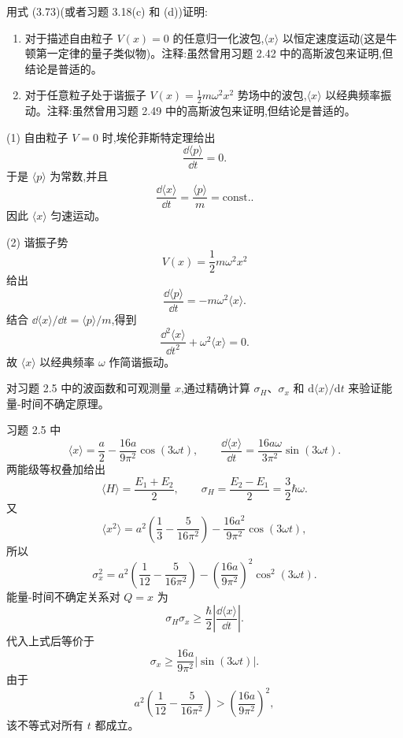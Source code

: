 \begin{question}
用式 (3.73)(或者习题 3.18(c) 和 (d))证明:
\begin{enumerate}
\item 对于描述自由粒子 $V(x)=0$ 的任意归一化波包,$\langle x\rangle$ 以恒定速度运动(这是牛顿第一定律的量子类似物)。注释:虽然曾用习题 2.42 中的高斯波包来证明,但结论是普适的。
\item 对于任意粒子处于谐振子 $V(x)=\frac12m\omega^2x^2$ 势场中的波包,$\langle x\rangle$ 以经典频率振动。注释:虽然曾用习题 2.49 中的高斯波包来证明,但结论是普适的。
\end{enumerate}

\par\smallskip
{}

\end{question}
\begin{solution}
(1) 自由粒子 $V=0$ 时,埃伦菲斯特定理给出
\[
\frac{\dd\langle p\rangle}{\dd t}=0.
\]
于是 $\langle p\rangle$ 为常数,并且
\[
\frac{\dd\langle x\rangle}{\dd t}=\frac{\langle p\rangle}{m}=\mathrm{const.}.
\]
因此 $\langle x\rangle$ 匀速运动。

(2) 谐振子势
\[
V(x)=\frac12m\omega^2x^2
\]
给出
\[
\frac{\dd\langle p\rangle}{\dd t}=-m\omega^2\langle x\rangle.
\]
结合 $\dd\langle x\rangle/\dd t=\langle p\rangle/m$,得到
\[
\frac{\dd^2\langle x\rangle}{\dd t^2}+\omega^2\langle x\rangle=0.
\]
故 $\langle x\rangle$ 以经典频率 $\omega$ 作简谐振动。
\end{solution}

\begin{question}
对习题 2.5 中的波函数和可观测量 $x$,通过精确计算 $\sigma_H$、$\sigma_x$ 和 $\mathrm d\langle x\rangle/\mathrm dt$ 来验证能量-时间不确定原理。
\end{question}
\begin{solution}
习题 2.5 中
\[
\langle x\rangle=\frac a2-\frac{16a}{9\pi^2}\cos(3\omega t),
\qquad
\frac{\dd\langle x\rangle}{\dd t}=\frac{16a\omega}{3\pi^2}\sin(3\omega t).
\]
两能级等权叠加给出
\[
\langle H\rangle=\frac{E_1+E_2}{2},
\qquad
\sigma_H=\frac{E_2-E_1}{2}=\frac32\hbar\omega.
\]
又
\[
\langle x^2\rangle
=a^2\left(\frac13-\frac{5}{16\pi^2}\right)-\frac{16a^2}{9\pi^2}\cos(3\omega t),
\]
所以
\[
\sigma_x^2
=a^2\left(\frac1{12}-\frac{5}{16\pi^2}\right)
-\left(\frac{16a}{9\pi^2}\right)^2\cos^2(3\omega t).
\]
能量-时间不确定关系对 $Q=x$ 为
\[
\sigma_H\sigma_x\ge \frac{\hbar}{2}\left|\frac{\dd\langle x\rangle}{\dd t}\right|.
\]
代入上式后等价于
\[
\sigma_x\ge \frac{16a}{9\pi^2}|\sin(3\omega t)|.
\]
由于
\[
a^2\left(\frac1{12}-\frac{5}{16\pi^2}\right)
>\left(\frac{16a}{9\pi^2}\right)^2,
\]
该不等式对所有 $t$ 都成立。
\end{solution}

